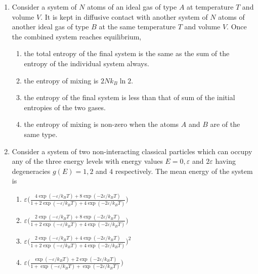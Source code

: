 \documentclass[journal,12pt,onecolumn]{IEEEtran}
\theoremstyle{remark}
\begin{document}
\begin{enumerate}
\item Consider a system of $N$ atoms of an ideal gas of type $A$ at temperature $T$ and volume $V$. It is kept in diffusive contact with another system of $N$ atoms of another ideal gas of type $B$ at the same temperature $T$ and volume $V$. Once the combined system reaches equilibrium,
\hfill{}
\begin{enumerate}
    \item the total entropy of the final system is the same as the sum of the entropy of the individual system always.
    \item the entropy of mixing is $2N k_B \ln 2$.
    \item the entropy of the final system is less than that of sum of the initial entropies of the two gases.
    \item the entropy of mixing is non-zero when the atoms $A$ and $B$ are of the same type.
\end{enumerate}


\item Consider a system of two non-interacting classical particles which can occupy any of the three energy levels with energy values $E=0,\varepsilon$ and $2\varepsilon$ having degeneracies $g(E)=1,2$ and $4$ respectively. The mean energy of the system is
\hfill{}
\begin{multicols}{2}
\begin{enumerate}
    \item $\varepsilon\biggl(\frac{4\exp(-\varepsilon/k_B T)+8\exp(-2\varepsilon/k_B T)}{1+2\exp(-\varepsilon/k_B T)+4\exp(-2\varepsilon/k_B T)}\biggr)$
    \item $ \varepsilon\biggl(\frac{2\exp(-\varepsilon/k_B T)+8\exp(-2\varepsilon/k_B T)}{1+2\exp(-\varepsilon/k_B T)+4\exp(-2\varepsilon/k_B T)}\biggr)$
    \item $ \varepsilon\biggl(\frac{2\exp(-\varepsilon/k_B T)+4\exp(-2\varepsilon/k_B T)}{1+2\exp(-\varepsilon/k_B T)+4\exp(-2\varepsilon/k_B T)}\biggr)^{2}$
    \item $ \varepsilon\biggl(\frac{\exp(-\varepsilon/k_B T)+2\exp(-2\varepsilon/k_B T)}{1+\exp(-\varepsilon/k_B T)+\exp(-2\varepsilon/k_B T)}\biggr)   $
\end{enumerate}
\end{multicols}


\end{enumerate}
\end{document}

